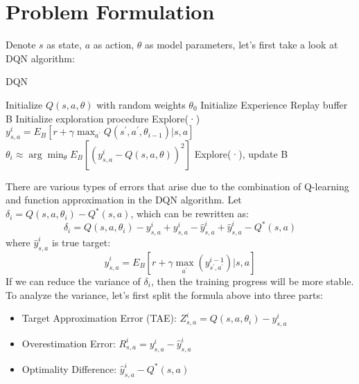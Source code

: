 \section{Problem Formulation}
\label{section:problem}
Denote $s$ as state, $a$ as action, $\theta$ as model parameters,
let's first take a look at DQN algorithm:
\begin{algorithm}[H]
  \caption{DQN}
  \begin{algorithmic}[1]
    \STATE Initialize \begin{math} Q(s,a,\theta)\end{math} with random weights \begin{math}\theta _0 \end{math}
    \STATE Initialize Experience Replay buffer B
    \STATE Initialize exploration procedure Explore(·)
        \STATE\begin{math}y^i_{s,a} = E_B[r+\gamma \max_{a^{'}} Q(s^{'},a^{'},\theta _{i-1})|s,a]\end{math}
        \STATE\begin{math}\theta _i\approx \arg\min_{\theta}E_B[(y^i_{s,a}-Q(s,a,\theta))^2]\end{math}
        \STATE Explore(·), update B
    \ENDFOR
  \end{algorithmic}
\end{algorithm}
There are various types of errors that arise due to the combination of Q-learning and function approximation in the DQN algorithm. Let \begin{math} \delta _i=Q(s,a,\theta _i)-Q^*(s,a)\end{math}, which can be rewritten as: 
\[\delta _i=Q(s,a,\theta _i)-y^i_{s,a}+y^i_{s,a}-\hat{y}^i_{s,a}+\hat{y}^i_{s,a}-Q^*(s,a)\]
where \begin{math}\hat{y}^i_{s,a}\end{math} is true target:
\[\hat{y}^i_{s,a}=E_B[r+\gamma \max_{a^{'}}(y^{i-1}_{s^{'},a^{'}})|s,a]\]
If we can reduce the variance of \begin{math} \delta _i\end{math}, then the training progress will be more stable. To analyze the variance, let's first split the formula above into three parts:
\begin{itemize}
    \item Target Approximation Error (TAE): \begin{math}Z^i_{s,a}=Q(s,a,\theta _i)-y^i_{s,a}\end{math}
    \item Overestimation Error: \begin{math}R^i_{s,a}=y^i_{s,a}-\hat{y}^i_{s,a}\end{math}
    \item Optimality Difference: \begin{math}\hat{y}^i_{s,a}-Q^*(s,a)\end{math}
\end{itemize}
